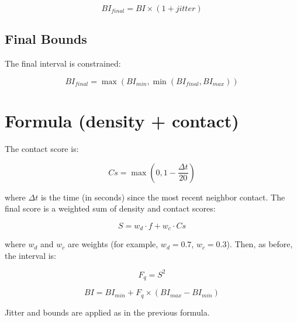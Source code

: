 \documentclass{article}
\begin{document}
\begin{equation}
BI_{final} = BI \times (1 + jitter)
\end{equation}

\subsection{Final Bounds}
The final interval is constrained:

\begin{equation}
BI_{final} = \max(BI_{min}, \min(BI_{final}, BI_{max}))
\end{equation}

\section{Formula (density + contact)}

The contact score is:

\begin{equation}
Cs = \max(0, 1 - \frac{\Delta t}{20})
\end{equation}

where $\Delta t$ is the time (in seconds) since the most recent neighbor contact. The final score is a weighted sum of density and contact scores:

\begin{equation}
S = w_d \cdot f + w_c \cdot Cs
\end{equation}

where $w_d$ and $w_c$ are weights (for example, $w_d = 0.7$, $w_c = 0.3$). Then, as before, the interval is:

\begin{equation}
F_q = S^2
\end{equation}

\begin{equation}
BI = BI_{min} + F_q \times (BI_{max} - BI_{min})
\end{equation}

Jitter and bounds are applied as in the previous formula.
\end{document}
